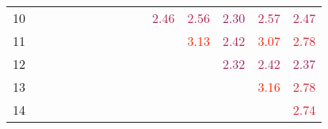 \documentclass[a4paper, 11pt, ngerman]{article}
\theoremstyle{definition}
\theoremstyle{plain}
\theoremstyle{remark}
\begin{document}
\begin{figure}
\begin{tabular}{c|cccccccccccccc}
        10                   &                                  &                                  &                                  &                                  &                                  &                                  &                                  &                                  &                                  & \textcolor[HTML]{ ab2053 }{2.46} & \textcolor[HTML]{ b72047 }{2.56} & \textcolor[HTML]{ 992065 }{2.30} & \textcolor[HTML]{ b92045 }{2.57} & \textcolor[HTML]{ ad2051 }{2.47} \\
        11                   &                                  &                                  &                                  &                                  &                                  &                                  &                                  &                                  &                                  &                                  & \textcolor[HTML]{ fc2002 }{3.13} & \textcolor[HTML]{ a72057 }{2.42} & \textcolor[HTML]{ f4200a }{3.07} & \textcolor[HTML]{ d2202c }{2.78} \\
        12                   &                                  &                                  &                                  &                                  &                                  &                                  &                                  &                                  &                                  &                                  &                                  & \textcolor[HTML]{ 9b2063 }{2.32} & \textcolor[HTML]{ a82056 }{2.42} & \textcolor[HTML]{ a1205d }{2.37} \\
        13                   &                                  &                                  &                                  &                                  &                                  &                                  &                                  &                                  &                                  &                                  &                                  &                                  & \textcolor[HTML]{ ff2000 }{3.16} & \textcolor[HTML]{ d2202c }{2.78} \\
        14                   &                                  &                                  &                                  &                                  &                                  &                                  &                                  &                                  &                                  &                                  &                                  &                                  &                                  & \textcolor[HTML]{ cd2031 }{2.74} \\
    \end{tabular}


\end{figure}
\end{document}
